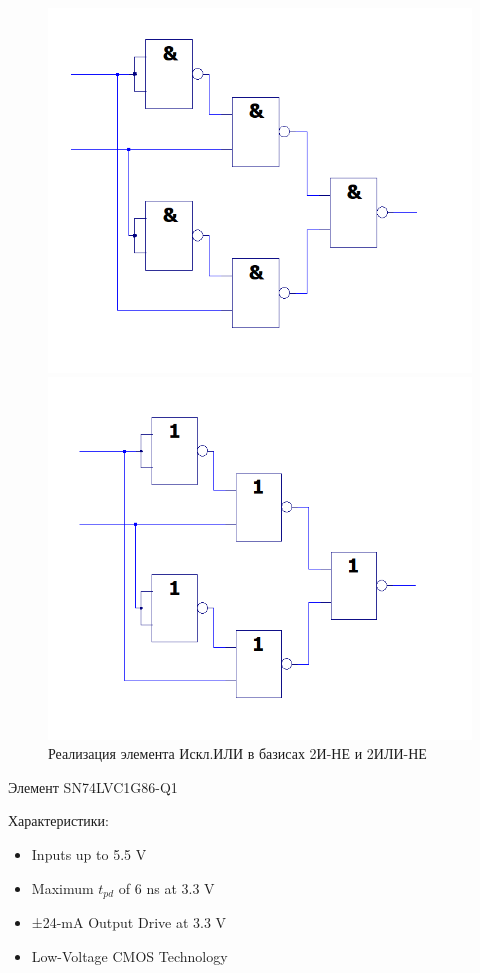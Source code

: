 \begin{figure}[H]
	\centering
	\begin{minipage}{.45\textwidth}
		\centering
		\includegraphics[width=0.85\linewidth]{imgs/1/xor_and}
	\end{minipage}
	\begin{minipage}{.45\textwidth}
		\centering
		\includegraphics[width=0.85\linewidth]{imgs/1/xor_or}
	\end{minipage}
	\caption{Реализация элемента Искл.ИЛИ в базисах 2И-НЕ и 2ИЛИ-НЕ}
\end{figure}


Элемент SN74LVC1G86-Q1

Характеристики:
\begin{itemize}
	\item Inputs up to 5.5 V
	\item Maximum $t_{pd}$ of 6 ns at 3.3 V
	\item ±24-mA Output Drive at 3.3 V
	\item Low-Voltage CMOS Technology 
\end{itemize}